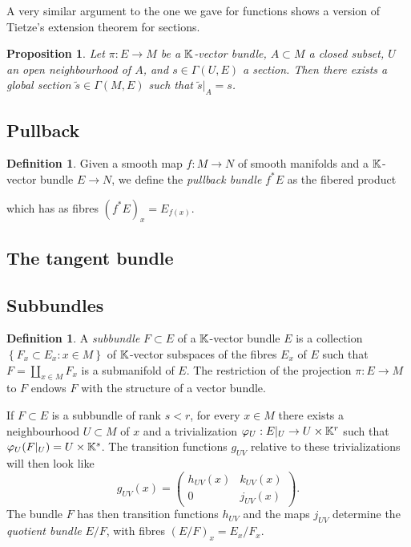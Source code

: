 \documentclass[11pt,a4paper]{book}
\newtheorem{prop}[thm]{Proposition}
\theoremstyle{remark} \newtheorem{rmk}[thm]{Remark}
\theoremstyle{definition} \newtheorem{defn}[thm]{Definition}
\theoremstyle{definition} \newtheorem{ex}[thm]{Example}
\theoremstyle{definition} \newtheorem{ej}[thm]{Exercise}
\begin{document}
A very similar argument to the one we gave for functions shows a version of Tietze's extension theorem for sections.

\begin{prop}
Let $\pi:E\rightarrow M$ be a $\mathbb K$-vector bundle, $A\subset M$ a closed subset, $U$ an open neighbourhood of $A$,  and $s\in \Gamma(U,E)$ a section. Then there exists a global section $\tilde{s}\in \Gamma(M,E)$ such that $\tilde{s}|_A = s$.
\end{prop}

\subsection{Pullback}
\begin{defn}
  Given a smooth map $f:M\rightarrow N$ of smooth manifolds and a $\mathbb K$-vector bundle $E\rightarrow N$, we define the \emph{pullback bundle} $f^*E$ as the fibered product
  \begin{center}
  \end{center}
  which has as fibres $(f^*E)_x = E_{f(x)}$.
\end{defn}

\subsection{The tangent bundle}

\subsection{Subbundles}
\begin{defn}
A \emph{subbundle} $F\subset E$ of a $\mathbb K$-vector bundle $E$ is a collection $\left\{ F_x \subset E_x : x\in M\right\}$ of $\mathbb K$-vector subspaces of the fibres $E_x$ of $E$ such that $F=\coprod_{x\in M} F_x$ is a submanifold of $E$. The restriction of the projection $\pi:E\rightarrow M$ to $F$ endows $F$ with the structure of a vector bundle.
\end{defn}

If $F\subset E$ is a subbundle of rank $s<r$, for every $x\in M$ there exists a neighbourhood $U\subset M$ of $x$ and a trivialization $\varphi_U:E|_U\rightarrow U \times \mathbb K^r$ such that $\varphi_U(F|_U)= U\times \mathbb K^s$. The transition functions $g_{UV}$ relative to these trivializations will then look like
\begin{equation*}
  g_{UV}(x) =
  \begin{pmatrix}
    h_{UV}(x) & k_{UV}(x) \\
    0 & j_{UV}(x)
\end{pmatrix}.
\end{equation*}
The bundle $F$ has then transition functions $h_{UV}$ and the maps $j_{UV}$ determine the \emph{quotient bundle} $E/F$, with fibres $(E/F)_x=E_x/F_x$.
\end{document}
